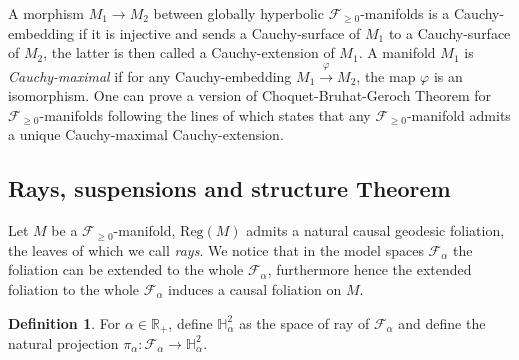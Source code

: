 \documentclass[a4paper,12pt]{article}
\def\H{\mathbb{H}}
\def\RR{\mathbb{R}}
\def\Reg{\mathrm{Reg}}
\def\reg{\Reg}
\def\Future{\mathcal F}
\def\reg{\mathrm{Reg}}
\def\Reg{\mathrm{Reg}}
\theoremstyle{definition}
\newtheorem{defi}[lem]{Definition}	%
\begin{document}
			A morphism $M_1\rightarrow M_2$ between globally hyperbolic $\Future_{\geq0}$-manifolds is a Cauchy-embedding if it is injective and sends a Cauchy-surface of $M_1$ to a Cauchy-surface of $M_2$, the latter is then called a Cauchy-extension of $M_1$. A manifold $M_1$ is {\it Cauchy-maximal} if for any Cauchy-embedding $M_1\xrightarrow{\varphi}M_2$, the map $\varphi$ is an isomorphism. One can prove \cite{thesis,brunswic2021Cauchy} a version of Choquet-Bruhat-Geroch Theorem for $\Future_{\geq0}$-manifolds following the lines of \cite{sbierski_geroch} which states that any $\Future_{\geq0}$-manifold admits a unique Cauchy-maximal Cauchy-extension.     
		\subsection{Rays, suspensions and structure Theorem}
		
		Let $M$ be a $\Future_{\geq0}$-manifold, $\reg(M)$ admits a natural causal geodesic foliation, the leaves of which we call {\it rays}. We notice that in the model spaces $\Future_\alpha$ the foliation can be extended to the whole $\Future_\alpha$, furthermore hence the extended foliation to the whole $\Future_\alpha$ induces a causal foliation on $M$.
		
		
		
		
		\begin{defi}\label{def:define_space_ray_define} For $\alpha\in \RR_+$, define $\H^2_\alpha$ as the space of ray of $\Future_\alpha$ and define the natural projection $\pi_\alpha: \Future_\alpha\rightarrow \H^2_\alpha$.
		\end{defi}
\end{document}
